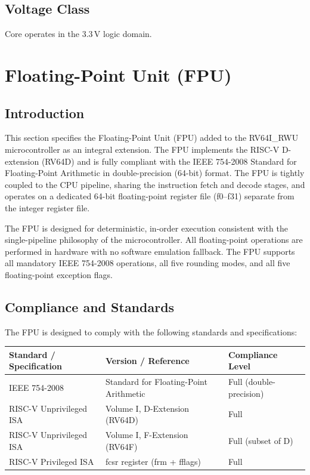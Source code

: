\subsection{Voltage Class}
Core operates in the 3.3\,V logic domain.

\section{Floating-Point Unit (FPU)}

\subsection{Introduction}
This section specifies the Floating-Point Unit (FPU) added to the RV64I\_RWU microcontroller as an integral extension. The FPU implements the RISC-V D-extension (RV64D) and is fully compliant with the IEEE 754-2008 Standard for Floating-Point Arithmetic in double-precision (64-bit) format. The FPU is tightly coupled to the CPU pipeline, sharing the instruction fetch and decode stages, and operates on a dedicated 64-bit floating-point register file (f0–f31) separate from the integer register file.

The FPU is designed for deterministic, in-order execution consistent with the single-pipeline philosophy of the microcontroller. All floating-point operations are performed in hardware with no software emulation fallback. The FPU supports all mandatory IEEE 754-2008 operations, all five rounding modes, and all five floating-point exception flags.

\subsection{Compliance and Standards}
The FPU is designed to comply with the following standards and specifications:

\begin{table}[H]
\centering
\begin{tabular}{|l|l|l|}
\hline
\textbf{Standard / Specification} & \textbf{Version / Reference} & \textbf{Compliance Level} \\ \hline
IEEE 754-2008 & Standard for Floating-Point Arithmetic & Full (double-precision) \\ \hline
RISC-V Unprivileged ISA & Volume I, D-Extension (RV64D) & Full \\ \hline
RISC-V Unprivileged ISA & Volume I, F-Extension (RV64F) & Full (subset of D) \\ \hline
RISC-V Privileged ISA & fcsr register (frm + fflags) & Full \\ \hline
\end{tabular}
\end{table}

